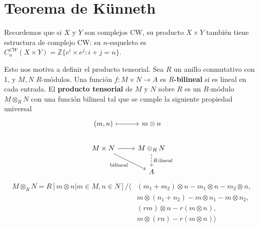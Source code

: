 \documentclass[spanish]{book}
\theoremstyle{definition}
\newcommand{\Z}{\mathbb{Z}}
\begin{document}
\section{Teorema de Künneth}
Recordemos que si $X$ y $Y$ son complejos CW, su producto $X\times Y$ también tiene estructura de complejo CW: su $n$-esqueleto es $C^{CW}_n(X\times Y)=\Z\{e^i\times e^j:i+j=n\}$.

Esto nos motiva a definir el producto tensorial. Sea $R$ un anillo conmutativo con 1, y $M,N$ $R$-módulos. Una función $f:M\times N\to A$ es \textbf{$R$-bilineal} si es lineal en cada entrada. El \textbf{producto tensorial} de $M$ y $N$ sobre $R$ es un $R$-módulo $M\otimes_RN$ con una función bilineal tal que se cumple la siguiente propiedad universal
\[\begin{tikzcd}
	(m,n)\arrow[r,maps to]&m\otimes n\\
	M\times N\arrow[r]\arrow[rd,swap,"\text{bilineal}"]&M\otimes_RN\arrow[d,dashed,"R\text{-lineal}"]\\
	&A
\end{tikzcd}\]
\begin{align*}
	M\otimes_RN=R[m\otimes n|m\in M,n\in N]\Big/\Big\langle &(m_1+m_2)\otimes n-m_1\otimes n-m_2\otimes n,\\
	&m\otimes(n_1+n_2)-m\otimes n_1-m\otimes n_2,\\
	&(rm)\otimes n-r(m\otimes n),\\
	&m\otimes(rn)-r(m\otimes n)\Big\rangle
\end{align*}
\end{document}
